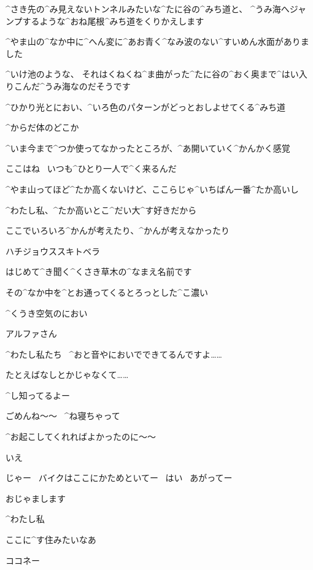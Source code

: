 \Kokone ^{さき}{先}の^{み}{見}えないトンネルみたいな^{たに}{谷}の^{みち}{道}と、
^{うみ}{海}へジャンプするような^{おね}{尾根}^{みち}{道}をくりかえします

\page[100]
\Kokone ^{やま}{山}の^{なか}{中}に^{へん}{変}に^{あお}{青}く^{なみ}{波}のない^{すいめん}{水面}がありました

\Kokone ^{いけ}{池}のような、
それはくねくね^{ま}{曲}がった^{たに}{谷}の^{おく}{奥}まで^{はい}{入}りこんだ^{うみ}{海}なのだそうです

\Kokone ^{ひかり}{光}とにおい、^{いろ}{色}のパターンがどっとおしよせてくる^{みち}{道}

\page[101]
\Kokone ^{からだ}{体}のどこか

\Kokone ^{いま}{今}まで^{つか}{使}ってなかったところが、^{あ}{開}いていく^{かんかく}{感覚}

\page[103]
\Alpha ここはね
\ いつも^{ひとり}{一人}で^{く}{来}るんだ

\Alpha ^{やま}{山}ってほど^{たか}{高}くないけど、ここらじゃ^{いちばん}{一番}^{たか}{高}いし

\Alpha ^{わたし}{私}、^{たか}{高}いとこ^{だい}{大}^{す}{好}きだから

\Alpha ここでいろいろ^{かんが}{考}えたり、^{かんが}{考}えなかったり

\page[104]
\Kokone ハチジョウススキトベラ

\Kokone はじめて^{き}{聞}く^{くさき}{草木}の^{なまえ}{名前}です

\Kokone その^{なか}{中}を^{とお}{通}ってくるとろっとした^{こ}{濃}い

\Kokone ^{くうき}{空気}のにおい

\page[105]
\Kokone アルファさん

\Kokone ^{わたし}{私}たち
\ ^{おと}{音}やにおいでできてるんですよ……

\Kokone たとえばなしとかじゃなくて……

\Alpha ^{し}{知}ってるよー

\page[108]
\Alpha ごめんね〜〜
\ ^{ね}{寝}ちゃって

\Alpha ^{お}{起}こしてくれればよかったのに〜〜

\Kokone いえ

\page[109]
\Alpha じゃー
\ バイクはここにかためといてー
\ はい
\ あがってー

\Kokone おじゃまします

\Kokone ^{わたし}{私}

\Kokone ここに^{す}{住}みたいなあ

\page[110]
\Alpha ココネー

